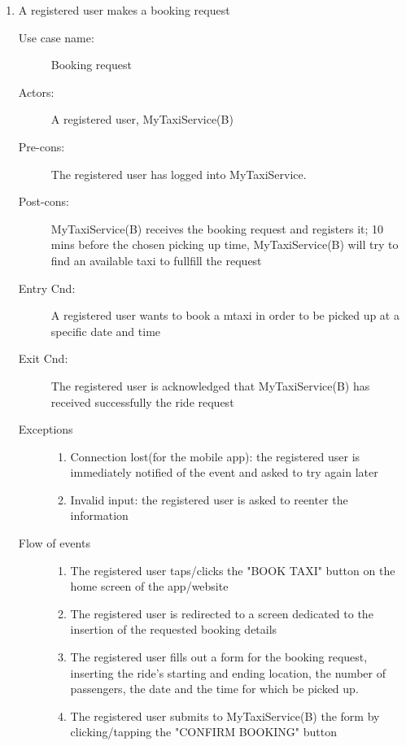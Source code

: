 \documentclass[11pt]{article} %
\begin{document}
\begin{enumerate}
	
	      \item A registered user makes a booking request
		\begin{description}
		         \item [Use case name:] Booking request
		         \item [Actors:] A registered user, MyTaxiService(B)
		         \item [Pre-cons:] The registered user has logged into MyTaxiService.
		         \item [Post-cons:] MyTaxiService(B) receives the booking request and registers it; 10 mins before
		         the chosen picking up time, MyTaxiService(B) will try to find an available taxi to fullfill the request
		         \item [Entry Cnd:] A registered user wants to book a mtaxi in order to be picked up at a specific date and time
		         \item [Exit Cnd:] The registered user is acknowledged that MyTaxiService(B) has received successfully the ride
		         request
		         \item [Exceptions]\hfill
			\begin{enumerate}
			           \item Connection lost(for the mobile app): the registered user is immediately notified of the event and
			           asked to try again later
				\item Invalid input: the registered user is asked to reenter the information
			\end{enumerate}
		         \item [Flow of events]\hfill
			\begin{enumerate}
			           \item The registered user taps/clicks the "BOOK TAXI" button on the home screen of the app/website
			           \item The registered user is redirected to a screen dedicated to the insertion
			           of the requested booking details
			           \item The registered user fills out a form for the booking request, inserting the ride's starting and ending location,
			           the number of passengers, the date and the time for which be picked up.
			           \item The registered user submits to MyTaxiService(B) the form by clicking/tapping the "CONFIRM BOOKING" button
			\end{enumerate}
		\end{description}

\end{enumerate}
\end{document}

